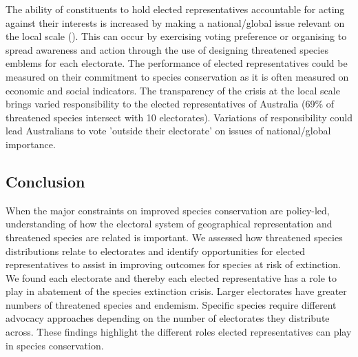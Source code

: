 \documentclass[a4paper,11pt]{article}
\begin{document}
The ability of constituents to hold elected representatives accountable for acting against their interests is increased by making a national/global issue relevant on the local scale (\cite{pitkinConceptRepresentation1972}). This can occur by exercising voting preference or organising to spread awareness and action through the use of designing threatened species emblems for each electorate. The performance of elected representatives could be measured on their commitment to species conservation as it is often measured on economic and social indicators. The transparency of the crisis at the local scale brings varied responsibility to the elected representatives of Australia (69\% of threatened species intersect with 10 electorates). Variations of responsibility could lead Australians to vote 'outside their electorate' on issues of national/global importance.



\subsection{Conclusion}

When the major constraints on improved species conservation are policy-led, understanding of how the electoral system of geographical representation and threatened species are related is important. We assessed how threatened species distributions relate to electorates and identify opportunities for elected representatives to assist in improving outcomes for species at risk of extinction. We found each electorate and thereby each elected representative has a role to play in abatement of the species extinction crisis. Larger electorates have greater numbers of threatened species and endemism. Specific species require different advocacy approaches depending on the number of electorates they distribute across. These findings highlight the different roles elected representatives can play in species conservation.
\end{document}
